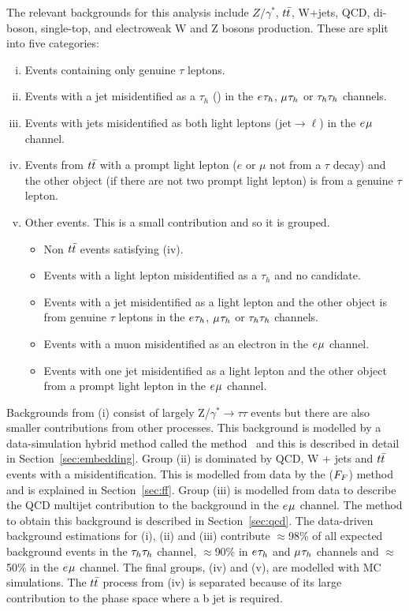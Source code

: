 The relevant backgrounds for this analysis include $Z/\gamma^*$, $t\bar{t}$, W+jets, \ac{QCD}, di-boson, single-top, and electroweak W and Z bosons production.
These are split into five categories:
\begin{enumerate}[i)]
  \item Events containing only genuine $\tau$ leptons.
  \item Events with a jet misidentified as a $\tau_h$ (\jtth) in the $e_{}\tau_{h}$, $\mu_{}\tau_{h}$ or $\tau_{h}\tau_{h}$ channels.
  \item Events with jets misidentified as both light leptons ($\text{jet}\rightarrow \ell$) in the $e_{}\mu_{}$ channel.
  \item Events from $t\bar{t}$ with a prompt light lepton ($e$ or $\mu$ not from a $\tau$ decay) and the other object (if there are not two prompt light lepton) is from a genuine $\tau$ lepton.
  \item Other events. This is a small contribution and so it is grouped.
  \begin{itemize}
    \item Non $t\bar{t}$ events satisfying (iv).
    \item Events with a light lepton misidentified as a $\tau_h$ and no \jtth candidate. 
    \item Events with a jet misidentified as a light lepton and the other object is from genuine $\tau$ leptons in the $e_{}\tau_{h}$, $\mu_{}\tau_{h}$ or $\tau_{h}\tau_{h}$ channels.
    \item Events with a muon misidentified as an electron in the $e_{}\mu_{}$ channel.
    \item Events with one jet misidentified as a light lepton and the other object from a prompt light lepton in the $e_{}\mu_{}$ channel.
   \end{itemize}
\end{enumerate}

Backgrounds from (i) consist of largely Z/$\gamma^* \rightarrow \tau\tau$ events but there are also smaller contributions from other processes. 
This background is modelled by a data-simulation hybrid method called the  method~\cite{CMS_embedding} and this is described in detail in Section~\ref{sec:embedding}.
Group (ii) is dominated by \ac{QCD}, W + jets and $t\bar{t}$ events with a \jtth misidentification.
This is modelled from data by the  ($F_{F}$) method~\cite{Sirunyan:2018zut,CMS:2018lkr} and is explained in Section~\ref{sec:ff}.
Group (iii) is modelled from data to describe the \ac{QCD} multijet contribution to the background in the $e_{}\mu_{}$ channel.
The method to obtain this background is described in Section~\ref{sec:qcd}.
The data-driven background estimations for (i), (ii) and (iii) contribute $\approx$98\% of all expected background events in the $\tau_{h}\tau_{h}$ channel, $\approx$90\% in $e_{}\tau_{h}$ and $\mu_{}\tau_{h}$ channels and $\approx$50\% in the $e_{}\mu_{}$ channel.
The final groups, (iv) and (v), are modelled with \ac{MC} simulations.
The $t\bar{t}$ process from (iv) is separated because of its large contribution to the phase space where a b jet is required. \\

